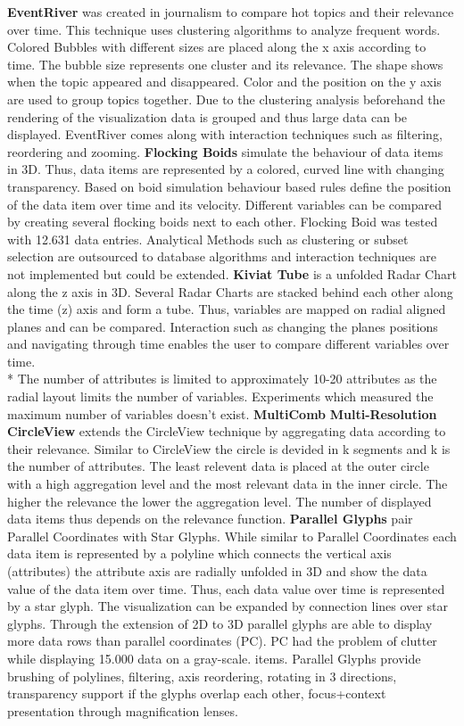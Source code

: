 \textbf{EventRiver} was created in journalism to compare hot topics and their relevance over time. This technique uses clustering algorithms to analyze frequent words. Colored Bubbles with different sizes are placed along the x axis according to time. The bubble size represents one cluster and its relevance. The shape shows when the topic appeared and disappeared. Color and the position on the y axis are used to group topics together.
Due to the clustering analysis beforehand the rendering of the visualization data is grouped and thus large data can be displayed. 
EventRiver comes along with interaction techniques such as filtering, reordering and zooming.
\textbf{Flocking Boids} simulate the behaviour of data items in 3D. Thus, data items are represented by a colored, curved line with changing transparency. Based on boid simulation behaviour based rules define the position of the data item over time and its velocity. Different variables can be compared by creating several flocking boids next to each other. Flocking Boid was tested with 12.631 data entries\cite{Moere2004}. 
Analytical Methods such as clustering or subset selection are outsourced to database algorithms and interaction techniques are not implemented but could be extended\cite{Moere2004}.
\textbf{Kiviat Tube} is a unfolded Radar Chart along the z axis in 3D. Several Radar Charts are stacked behind each other along the time (z) axis and form a tube. Thus, variables are mapped on radial aligned planes and can be compared. Interaction such as changing the planes positions and navigating through time enables the user to compare different variables over time.\\*
The number of attributes is limited to approximately 10-20 attributes as the radial layout limits the number of variables. Experiments which measured the maximum number of variables doesn't exist. 
\textbf{MultiComb}
\textbf{Multi-Resolution CircleView} extends the CircleView technique by aggregating data according to their relevance. Similar to CircleView the circle is devided in k segments and k is the number of attributes. The least relevent data is placed at the outer circle with a high aggregation level and the most relevant data in the inner circle. The higher the relevance the lower the aggregation level. The number of displayed data items thus depends on the relevance function. 
\textbf{Parallel Glyphs} pair Parallel Coordinates with Star Glyphs. While similar to Parallel Coordinates each data item is represented by a polyline which connects the vertical axis (attributes) the attribute axis are radially unfolded in 3D and show the data value of the data item over time. Thus, each data value over time is represented by a star glyph. The visualization can be expanded by connection lines over star glyphs. Through the extension of 2D to 3D parallel glyphs are able to display more data rows than parallel coordinates (PC). PC had the problem of clutter while displaying 15.000 data on a gray-scale.  items\cite{Keimb}.
Parallel Glyphs provide brushing of polylines, filtering, axis reordering, rotating in 3 directions, transparency support if the glyphs overlap each other, focus+context presentation through magnification lenses.

